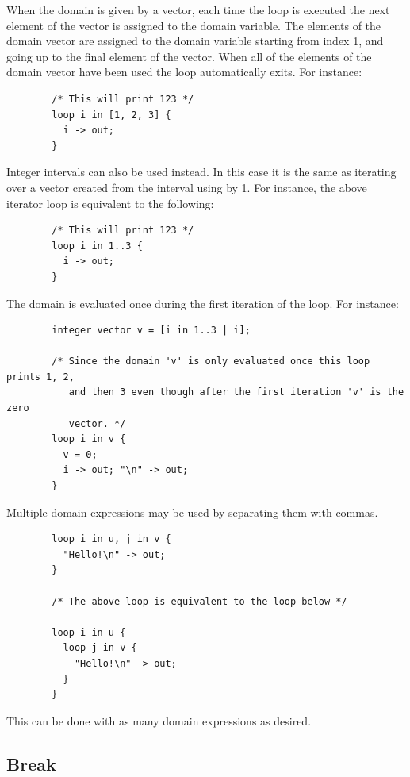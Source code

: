 \documentclass{article}
\begin{document}
      When the domain is given by a vector, each time the loop is executed the next element of the vector is
      assigned to the domain variable. The elements of the domain vector are assigned to the domain variable
      starting from index 1, and going up to the final element of the vector. When all of the elements of the
      domain vector have been used the loop automatically exits. For instance:

      \begin{lstlisting}
        /* This will print 123 */
        loop i in [1, 2, 3] {
          i -> out;
        }
      \end{lstlisting}

      Integer intervals can also be used instead. In this case it is the same as iterating over a vector created
      from the interval using by 1. For instance, the above iterator loop is equivalent to the following:

      \begin{lstlisting}
        /* This will print 123 */
        loop i in 1..3 {
          i -> out;
        }
      \end{lstlisting}

      The domain is evaluated once during the first iteration of the loop. For instance:

      \begin{lstlisting}
        integer vector v = [i in 1..3 | i];

        /* Since the domain 'v' is only evaluated once this loop prints 1, 2,
           and then 3 even though after the first iteration 'v' is the zero
           vector. */
        loop i in v {
          v = 0;
          i -> out; "\n" -> out;
        }
      \end{lstlisting}

      Multiple domain expressions may be used by separating them with commas.

      \begin{lstlisting}
        loop i in u, j in v {
          "Hello!\n" -> out;
        }

        /* The above loop is equivalent to the loop below */

        loop i in u {
          loop j in v {
            "Hello!\n" -> out;
          }
        }
      \end{lstlisting}

      This can be done with as many domain expressions as desired.


  \subsection{Break}\label{sec:break}
\end{document}
